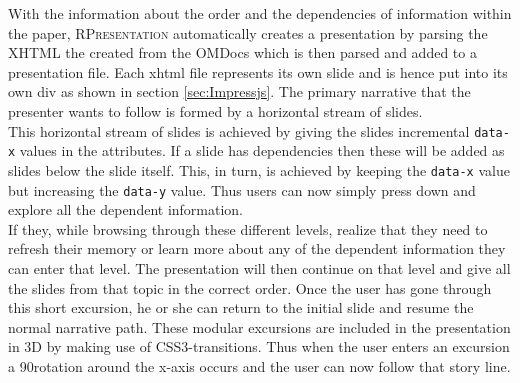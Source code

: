 \documentclass[twoside, 12pt]{article}
\newcommand{\sys}{\textsc{RPresentation}\xspace}
\begin{document}
With the information about the order and the dependencies of information within the paper, \sys automatically creates a presentation by parsing the XHTML the created from the OMDocs which is then parsed and added to a presentation file. Each xhtml file represents its own slide and is hence put into its own div as shown in section \ref{sec:Impressjs}. The primary narrative that the presenter wants to follow is formed by a horizontal stream of slides. \\

This horizontal stream of slides is achieved by giving the slides incremental \texttt{data-x} values in the attributes. If a slide has dependencies then these will be added as slides below the slide itself. This, in turn, is achieved by keeping the \texttt{data-x} value but increasing the \texttt{data-y} value. Thus users can now simply press down and explore all the dependent information.\\ 

If they, while browsing through these different levels, realize that they need to refresh their memory or learn more about any of the dependent information they can enter that level. The presentation will then continue on that level and give all the slides from that topic in the correct order. Once the user has gone through this short excursion, he or she can return to the initial slide and resume the normal narrative path. These modular excursions are included in the presentation in 3D by making use of CSS3-transitions. Thus when the user enters an excursion a 90\degree rotation around the x-axis occurs and the user can now follow that story line.\\



\end{document}
